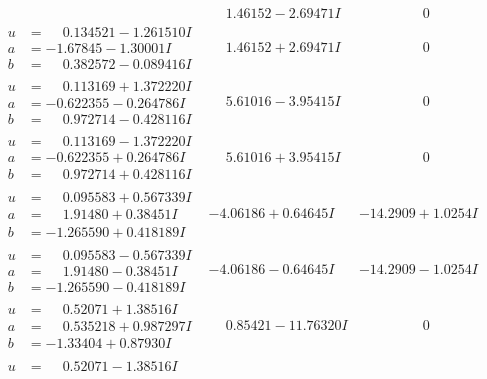 \documentclass[1p]{elsarticle_modified}
\theoremstyle{definition}
\begin{document}
$$\begin{array}{c|c|c}
 & \phantom{-}1.46152 - 2.69471 I & \phantom{-0.000000 } 0 \\ \hline\begin{aligned}
u &= \phantom{-}0.134521 - 1.261510 I \\
a &= -1.67845 - 1.30001 I \\
b &= \phantom{-}0.382572 - 0.089416 I\end{aligned}
 & \phantom{-}1.46152 + 2.69471 I & \phantom{-0.000000 } 0 \\ \hline\begin{aligned}
u &= \phantom{-}0.113169 + 1.372220 I \\
a &= -0.622355 - 0.264786 I \\
b &= \phantom{-}0.972714 - 0.428116 I\end{aligned}
 & \phantom{-}5.61016 - 3.95415 I & \phantom{-0.000000 } 0 \\ \hline\begin{aligned}
u &= \phantom{-}0.113169 - 1.372220 I \\
a &= -0.622355 + 0.264786 I \\
b &= \phantom{-}0.972714 + 0.428116 I\end{aligned}
 & \phantom{-}5.61016 + 3.95415 I & \phantom{-0.000000 } 0 \\ \hline\begin{aligned}
u &= \phantom{-}0.095583 + 0.567339 I \\
a &= \phantom{-}1.91480 + 0.38451 I \\
b &= -1.265590 + 0.418189 I\end{aligned}
 & -4.06186 + 0.64645 I & -14.2909 + 1.0254 I \\ \hline\begin{aligned}
u &= \phantom{-}0.095583 - 0.567339 I \\
a &= \phantom{-}1.91480 - 0.38451 I \\
b &= -1.265590 - 0.418189 I\end{aligned}
 & -4.06186 - 0.64645 I & -14.2909 - 1.0254 I \\ \hline\begin{aligned}
u &= \phantom{-}0.52071 + 1.38516 I \\
a &= \phantom{-}0.535218 + 0.987297 I \\
b &= -1.33404 + 0.87930 I\end{aligned}
 & \phantom{-}0.85421 - 11.76320 I & \phantom{-0.000000 } 0 \\ \hline\begin{aligned}
u &= \phantom{-}0.52071 - 1.38516 I \\

\end{aligned}
\end{array}$$
\end{document}

